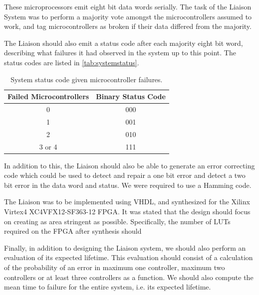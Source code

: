 These microprocessors emit eight bit data words serially. The task of
the Liaison System was to perform a majority vote amongst the
microcontrollers assumed to work, and tag microcontrollers as broken
if their data differed from the majority.

The Liaison should also emit a status code after each majority eight
bit word, describing what failures it had observed in the system up to
this point. The status codes are listed in \autoref{tab:systemstatus}.

\begin{table}[htbp]
  \centering
  \begin{tabular}{|c|c|}
    \hline
    \textbf{Failed Microcontrollers} & \textbf{Binary Status Code} \\ \hline
    0 & 000 \\ \hline
    1 & 001 \\ \hline
    2 & 010 \\ \hline
    3 or 4 & 111 \\ \hline
  \end{tabular}
  \caption{System status code given microcontroller failures.}
  \label{tab:systemstatus}
\end{table}

In addition to this, the Liaison should also be able to generate an
error correcting code which could be used to detect and repair a one
bit error and detect a two bit error in the data word and status. We
were required to use a Hamming code\cite{task}\cite{ecc}.

The Liaison was to be implemented using VHDL, and synthesized for the
Xilinx Virtex4 XC4VFX12-SF363-12 FPGA. It was stated that the design should focus on
creating as area stringent as possible. Specifically, the number of
LUTs required on the FPGA after synthesis should

Finally, in addition to designing the Liaison system, we should also
perform an evaluation of its expected lifetime. This evaluation should
consist of a calculation of the probability of an error in maximum one
controller, maximum two controllers or at least three controllers as a
function. We should also compute the mean time to failure for the
entire system, i.e. its expected lifetime.
